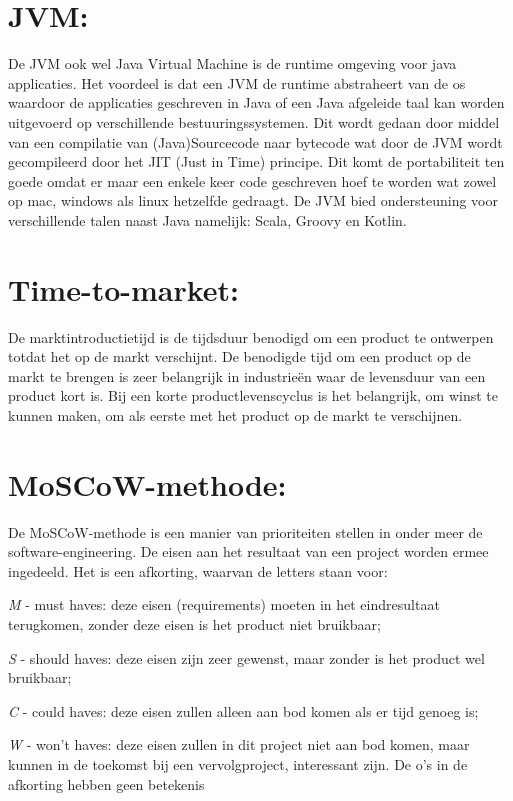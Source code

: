 \section{JVM:}\label{sec:jvm:}
De JVM ook wel Java Virtual Machine is de runtime omgeving voor java applicaties.
Het voordeel is dat een JVM de runtime abstraheert van de os waardoor de applicaties geschreven in Java of een Java afgeleide taal kan worden uitgevoerd op verschillende bestuuringssystemen.
Dit wordt gedaan door middel van een compilatie van (Java)Sourcecode naar bytecode wat door de JVM wordt gecompileerd door het JIT (Just in Time) principe.
Dit komt de portabiliteit ten goede omdat er maar een enkele keer code geschreven hoef te worden wat zowel op mac, windows als linux hetzelfde gedraagt.
De JVM bied ondersteuning voor verschillende talen naast Java namelijk: Scala, Groovy en Kotlin.
\smallskip

\section{Time-to-market:}\label{sec:time-to-market:}
De marktintroductietijd is de tijdsduur benodigd om een product te ontwerpen totdat het op de markt verschijnt.
De benodigde tijd om een product op de markt te brengen is zeer belangrijk in industrieën waar de levensduur van een product kort is.
Bij een korte productlevenscyclus is het belangrijk, om winst te kunnen maken, om als eerste met het product op de markt te verschijnen.
\smallskip

\section{MoSCoW-methode:}\label{sec:moscow-methode:}
De MoSCoW-methode is een manier van prioriteiten stellen in onder meer de software-engineering.
De eisen aan het resultaat van een project worden ermee ingedeeld.
Het is een afkorting, waarvan de letters staan voor:

\textit{M} - must haves: deze eisen (requirements) moeten in het eindresultaat terugkomen, zonder deze eisen is het product niet bruikbaar;

\textit{S} - should haves: deze eisen zijn zeer gewenst, maar zonder is het product wel bruikbaar;

\textit{C} - could haves: deze eisen zullen alleen aan bod komen als er tijd genoeg is;

\textit{W} - won't haves: deze eisen zullen in dit project niet aan bod komen, maar kunnen in de toekomst bij een vervolgproject, interessant zijn.
De o's in de afkorting hebben geen betekenis
\smallskip
